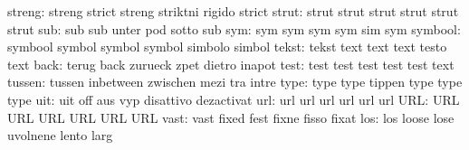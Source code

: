                    streng: streng                    strict
                           streng                    striktni
                           rigido                    strict
                    strut: strut                     strut
                           strut                     strut
                           strut                     strut
                      sub: sub                       sub
                           unter                     pod
                           sotto                     sub
                      sym: sym                       sym
                           sym                       sym
                           sim                       sym
                  symbool: symbool                   symbol
                           symbol                    symbol
                           simbolo                   simbol
                    tekst: tekst                     text
                           text                      text
                           testo                     text
                     back: terug                     back
                           zurueck                   zpet
                           dietro                    inapot
                     test: test                      test
                           test                      test
                           test                      text
                   tussen: tussen                    inbetween
                           zwischen                  mezi
                           tra                       intre
                     type: type                      type
                           tippen                    type
                           type                      type %
                      uit: uit                       off
                           aus                       vyp
                           disattivo                 dezactivat
                      url: url                       url
                           url                       url
                           url                       url
                      URL: URL                       URL
                           URL                       URL
                           URL                       URL
                     vast: vast                      fixed
                           fest                      fixne
                           fisso                     fixat
                      los: los                       loose
                           lose                      uvolnene
                           lento                     larg
